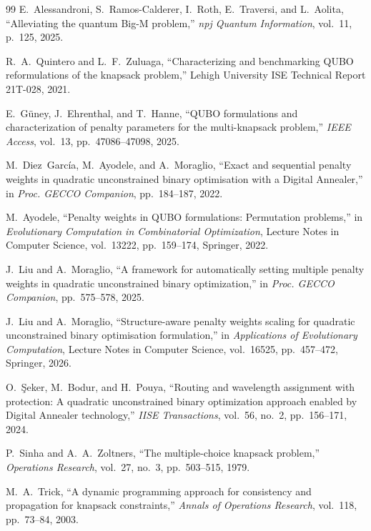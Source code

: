 \documentclass[twocolumn]{article}
\begin{document}
\begin{thebibliography}{99}
E.~Alessandroni, S.~Ramos-Calderer, I.~Roth, E.~Traversi, and
L.~Aolita,
``Alleviating the quantum Big-M problem,''
\emph{npj Quantum Information}, vol.~11, p.~125, 2025.

R.~A.~Quintero and L.~F.~Zuluaga,
``Characterizing and benchmarking QUBO reformulations of the knapsack
problem,''
Lehigh University ISE Technical Report 21T-028, 2021.

E.~G\"uney, J.~Ehrenthal, and T.~Hanne,
``QUBO formulations and characterization of penalty parameters for
the multi-knapsack problem,''
\emph{IEEE Access}, vol.~13, pp.~47086--47098, 2025.

M.~Diez~Garc\'ia, M.~Ayodele, and A.~Moraglio,
``Exact and sequential penalty weights in quadratic unconstrained
binary optimisation with a Digital Annealer,''
in \emph{Proc. GECCO Companion}, pp.~184--187, 2022.

M.~Ayodele,
``Penalty weights in QUBO formulations: Permutation problems,''
in \emph{Evolutionary Computation in Combinatorial Optimization},
Lecture Notes in Computer Science, vol.~13222, pp.~159--174,
Springer, 2022.

J.~Liu and A.~Moraglio,
``A framework for automatically setting multiple penalty weights in
quadratic unconstrained binary optimization,''
in \emph{Proc. GECCO Companion}, pp.~575--578, 2025.

J.~Liu and A.~Moraglio,
``Structure-aware penalty weights scaling for quadratic unconstrained
binary optimisation formulation,''
in \emph{Applications of Evolutionary Computation}, Lecture Notes in
Computer Science, vol.~16525, pp.~457--472, Springer, 2026.

O.~\c{S}eker, M.~Bodur, and H.~Pouya,
``Routing and wavelength assignment with protection: A quadratic
unconstrained binary optimization approach enabled by Digital
Annealer technology,''
\emph{IISE Transactions}, vol.~56, no.~2, pp.~156--171, 2024.

P.~Sinha and A.~A.~Zoltners,
``The multiple-choice knapsack problem,''
\emph{Operations Research}, vol.~27, no.~3, pp.~503--515, 1979.

M.~A.~Trick,
``A dynamic programming approach for consistency and propagation for
knapsack constraints,''
\emph{Annals of Operations Research}, vol.~118, pp.~73--84, 2003.


\end{thebibliography}
\end{document}

